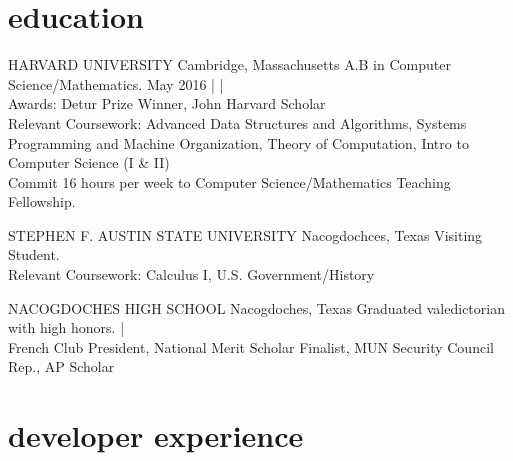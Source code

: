 \documentclass[]{friggeri-cv} %
\begin{document}

\section{education}

{HARVARD UNIVERSITY}
{Cambridge, Massachusetts}
{A.B in Computer Science/Mathematics.
May 2016 |
 |
\\
Awards: Detur Prize Winner, John Harvard Scholar \\
Relevant Coursework: Advanced Data Structures and Algorithms,  Systems Programming and Machine Organization, Theory of Computation, Intro to Computer Science (I \& II)\\
Commit 16 hours per week to Computer Science/Mathematics Teaching Fellowship.\\
}
\begin{detailed}
{STEPHEN F. AUSTIN STATE UNIVERSITY}
{Nacogdochces, Texas}
{Visiting Student. \\
Relevant Coursework: Calculus I, U.S. Government/History \\
}
\end{detailed}
{NACOGDOCHES HIGH SCHOOL}
{Nacogdoches, Texas}
{Graduated valedictorian with high honors.  | \\
French Club President, National Merit Scholar Finalist, MUN Security Council Rep., AP Scholar}



\section{developer experience}
\end{document}
